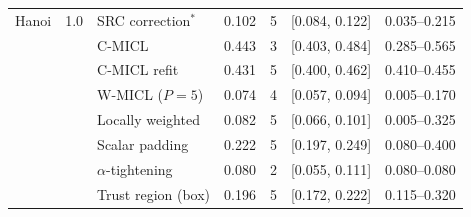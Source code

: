 {\begin{longtable}{llllccc}
\addlinespace[2pt]
Hanoi & 1.0 & SRC correction$^{\ast}$ & 0.102 & 5 & [0.084, 0.122] & 0.035--0.215 \\
 &  & C-MICL & 0.443 & 3 & [0.403, 0.484] & 0.285--0.565 \\
 &  & C-MICL refit & 0.431 & 5 & [0.400, 0.462] & 0.410--0.455 \\
 &  & W-MICL ($P{=}5$) & 0.074 & 4 & [0.057, 0.094] & 0.005--0.170 \\
 &  & Locally weighted & 0.082 & 5 & [0.066, 0.101] & 0.005--0.325 \\
 &  & Scalar padding & 0.222 & 5 & [0.197, 0.249] & 0.080--0.400 \\
 &  & $\alpha$-tightening & 0.080 & 2 & [0.055, 0.111] & 0.080--0.080 \\
 &  & Trust region (box) & 0.196 & 5 & [0.172, 0.222] & 0.115--0.320 \\
\bottomrule
\end{longtable}}
